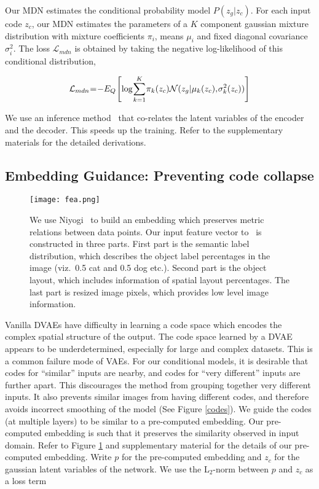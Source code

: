 \documentclass[10pt,twocolumn,letterpaper]{article}
\begin{document}
Our MDN estimates the conditional probability model $P(z_{g} | z_{c})$. For each input code 
$z_c$, our MDN estimates the parameters of a $K$ component gaussian mixture distribution with 
mixture coefficients $\pi_i$, means $\mu_i$ and fixed diagonal covariance $\sigma_i^2$. The
loss $\mathcal{L}_{mdn}$ is obtained by taking the negative log-likelihood of this 
conditional distribution, 

\begin{equation}
\medmuskip=1mu
\thinmuskip=1mu
\thickmuskip=1mu
 \mathcal{L}_{mdn} = -E_{Q}\left[\log \sum_{k=1}^K \pi_k(z_c) \mathcal{N}(z_g|\mu_k(z_c), \sigma_k^2(z_c))\right]  
\end{equation}

We use an inference method~\cite{sonderby2016ladder} that co-relates the latent variables of 
the encoder and the decoder. This speeds up the training. Refer to the supplementary materials 
for the detailed derivations.



\subsection{Embedding Guidance: Preventing code collapse}
\label{sec:embed}

\begin{figure}[!t]
\centerline{  \texttt{[image: fea.png]}}
  \caption{We use Niyogi~\cite{niyogi2004locality} to build an embedding which 
   preserves metric relations between data points. Our input feature vector to~\cite{niyogi2004locality} 
   is constructed in three parts. First part is the semantic label distribution, which describes the 
   object label percentages in the image (viz.\ 0.5 cat and 0.5 dog etc.). Second part is the object 
   layout, which includes information of spatial layout percentages. The last part is resized 
   image pixels, which provides low level image information.}
  \label{fig:fea}
\end{figure}


Vanilla DVAEs have difficulty in learning a code space which encodes the complex spatial 
structure of the output. The code space learned by a DVAE appears to be underdetermined, 
especially for large and complex datasets. This is a common failure mode of VAEs. 
For our conditional models, it is desirable that codes for ``similar'' inputs are nearby, 
and codes for ``very different'' inputs are further apart. This discourages the method 
from grouping together very different inputs. It also prevents similar images from
having different codes, and therefore avoids incorrect smoothing of the model (See 
Figure \ref{codes}). We guide the codes (at multiple layers) to be similar to a pre-computed 
embedding. Our pre-computed embedding is such that it preserves the similarity observed in 
input domain. Refer to Figure \ref{fig:fea} and supplementary material for the details 
of our pre-computed embedding. Write $p$ for the pre-computed embedding and $z_c$ for the gaussian latent 
variables of the network. We use the L$_{2}$-norm between $p$ and $z_c$ as a loss term
\end{document}
